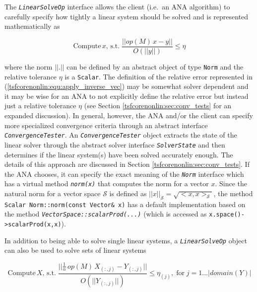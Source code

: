 The \texttt{\textit{Linear\-Solve\-Op}} interface allows the client
(i.e.~an ANA algorithm) to carefully specify how tightly a linear
system should be solved and is represented mathematically as

\begin{equation}
\mbox{Compute} \, x, \, \mbox{s.t.} \; \frac{||op(M) \, x - y||}{O(||y||)} \le \eta
\label{tsfcorenonlin:equ:apply_inverse_vec}
\end{equation}

where the norm $||.||$ can be defined by an abstract object of type
\texttt{Norm} and the relative tolerance $\eta$ is a \texttt{Scalar}.
The definition of the relative error represented in
(\ref{tsfcorenonlin:equ:apply_inverse_vec}) may be somewhat solver
dependent and it may be wise for an ANA to not explicitly define the
relative error but instead just a relative tolerance $\eta$ (see
Section \ref{tsfcorenonlin:sec:conv_tests} for an expanded
discussion).  In general, however, the ANA and/or the client can
specify more specialized convergence criteria through an abstract
interface \texttt{\textit{ConvergenceTester}}.  An
\texttt{\textit{ConvergenceTester}} object extracts the state of the
linear solver through the abstract solver interface
\texttt{\textit{Solver\-State}} and then determines if the linear
system(s) have been solved accurately enough. The details of this
approach are discussed in Section \ref{tsfcorenonlin:sec:conv_tests}.  If the
ANA chooses, it can specify the exact meaning of the
\texttt{\textit{Norm}} interface which has a virtual method
\texttt{\textit{norm(x)}} that computes the norm for a vector $x$.
Since the natural norm for a vector space $\mathcal{S}$ is defined as
$||x||_{\mathcal{S}} = \sqrt{<x,x>_{\mathcal{S}}}$, the method
\texttt{Scalar Norm::norm(const Vector\& x)} has a default
implementation based on the method
\texttt{\textit{VectorSpace::scalarProd(...)}}  (which is accessed as
\texttt{x.space()->scalarProd(x,x)}).

In addition to being able to solve single linear systems, a
\texttt{\textit{Linear\-Solve\-Op}} object can also be used to
solve sets of linear systems

\begin{equation}
\mbox{Compute} \, X, \, \mbox{s.t.} \;
\frac{||\frac{1}{\alpha}\,op(M)\,X_{(:,j)} - Y_{(:,j)}||}{O(||Y_{(:,j)}||)} \le \eta_{(j)},
\;\mbox{for}\;j=1 \ldots |domain(Y)|
\label{tsfcorenonlin:equ:apply_inverse_multi_vec}
\end{equation}

